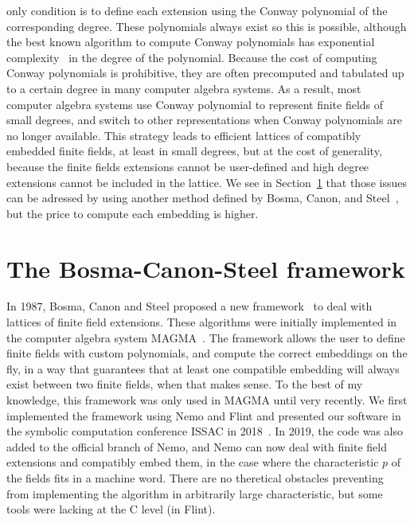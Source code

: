 only condition is to define each extension using the Conway polynomial of the
corresponding degree. These polynomials always exist so this is possible,
although the best known algorithm to compute Conway polynomials has exponential
complexity~\cite{HL04} in the degree of the polynomial. Because the cost of
computing Conway polynomials is
prohibitive, they are often precomputed and tabulated up to a certain degree in
many computer algebra systems. As a result, most computer algebra systems use
Conway polynomial to represent finite fields of small degrees, and switch to
other representations when Conway polynomials are no longer available. This
strategy leads to efficient lattices of compatibly embedded finite fields, at
least in small degrees, but at the cost of generality, because the finite fields
extensions cannot be user-defined and high degree extensions cannot be included
in the lattice. We see in Section~\ref{sec:bosma-canon-steel} that those issues
can be adressed by using another method 
defined by Bosma, Canon, and Steel~\cite{BCS97}, but the price to compute each
embedding is higher.
%

\section{The Bosma-Canon-Steel framework}
\label{sec:bosma-canon-steel}

In 1987, Bosma, Canon and Steel proposed a new framework~\cite{BCS97} to deal
with lattices of finite field extensions. These algorithms were initially
implemented in the computer algebra system MAGMA~\cite{Magma}. The framework allows the user
to define finite fields with custom polynomials, and compute the
correct embeddings on the fly, in a way that guarantees that at least one
compatible embedding will always exist between two finite fields, when that
makes sense. To the best of my knowledge, this framework was only used in MAGMA
until very recently. We first implemented the framework using Nemo and Flint and
presented our software in the symbolic computation conference ISSAC in
2018~\cite{DRR18}. In 2019, the code was also added to the official branch of
Nemo, and Nemo can now deal with finite field extensions and compatibly embed
them, in the case where the characteristic $p$ of the fields fits in a machine
word. There are no theretical obstacles preventing from implementing the
algorithm in arbitrarily large characteristic, but some tools were lacking at
the C level (\ie in Flint).

